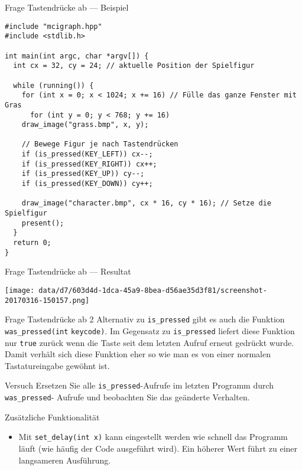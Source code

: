 \documentclass[presentation]{beamer}
\begin{document}
\begin{frame}[label={sec:orgfe83f24},fragile]{Frage Tastendrücke ab --- Beispiel}
 \begin{verbatim}
#include "mcigraph.hpp"
#include <stdlib.h>

int main(int argc, char *argv[]) {
  int cx = 32, cy = 24; // aktuelle Position der Spielfigur

  while (running()) {
    for (int x = 0; x < 1024; x += 16) // Fülle das ganze Fenster mit Gras
      for (int y = 0; y < 768; y += 16)
	draw_image("grass.bmp", x, y);

    // Bewege Figur je nach Tastendrücken
    if (is_pressed(KEY_LEFT)) cx--;
    if (is_pressed(KEY_RIGHT)) cx++;
    if (is_pressed(KEY_UP)) cy--;
    if (is_pressed(KEY_DOWN)) cy++;

    draw_image("character.bmp", cx * 16, cy * 16); // Setze die Spielfigur
    present();
  }
  return 0;
}
\end{verbatim}
\end{frame}
\begin{frame}[label={sec:org1830fff}]{Frage Tastendrücke ab --- Resultat}
\begin{center}
\texttt{[image: data/d7/603d4d-1dca-45a9-8bea-d56ae35d3f81/screenshot-20170316-150157.png]}
\end{center}
\end{frame}
\begin{frame}[label={sec:org37f968f},fragile]{Frage Tastendrücke ab 2}
 Alternativ zu {\color{solarizedYellow}\verb!is_pressed!} gibt es auch die Funktion {\color{solarizedYellow}\verb!was_pressed(int! 
\verb!keycode)!}. Im Gegensatz zu {\color{solarizedYellow}\verb!is_pressed!} liefert diese Funktion nur
{\color{solarizedYellow}\verb!true!} zurück wenn die Taste seit dem letzten Aufruf erneut gedrückt
wurde. Damit verhält sich diese Funktion eher so wie man es von einer
normalen Tastatureingabe gewöhnt ist.
\begin{block}{Versuch}
Ersetzen Sie alle {\color{solarizedYellow}\verb!is_pressed!}-Aufrufe im letzten Programm durch
{\color{solarizedYellow}\verb!was_pressed!}- Aufrufe und beobachten Sie das geänderte Verhalten.
\end{block}
\end{frame}
\begin{frame}[label={sec:org0ade2c6},fragile]{Zusätzliche Funktionalität}
 \begin{itemize}
\item Mit {\color{solarizedYellow}\verb!set_delay(int x)!} kann eingestellt werden wie schnell das
Programm läuft (wie häufig der Code ausgeführt wird). Ein höherer
Wert führt zu einer langsameren Ausführung.
\end{itemize}
\end{frame}
\end{document}
